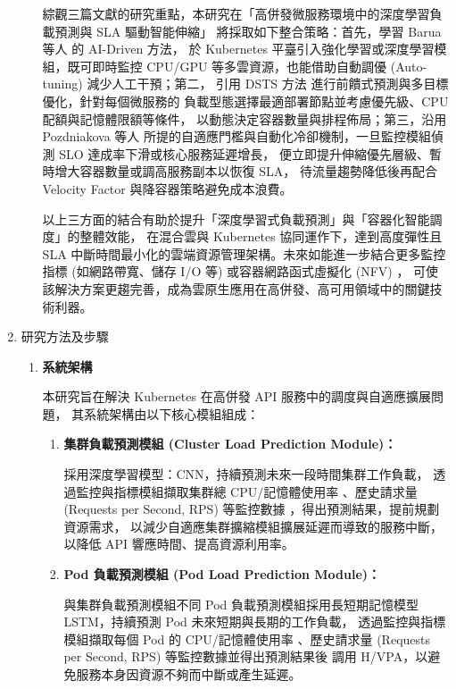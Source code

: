 \documentclass[12pt,a4paper]{article}
\begin{document}
\begin{enumerate}[label={(\zhdig*)}, leftmargin=2\parindent, listparindent=\parindent]
\begin{enumerate}[label={(\arabic*)}, leftmargin=\parindent, listparindent=\parindent]
綜觀三篇文獻的研究重點，本研究在「高併發微服務環境中的深度學習負載預測與 SLA 驅動智能伸縮」
將採取如下整合策略：首先，學習 Barua 等人\cite{22} 的 AI-Driven 方法，
於 Kubernetes 平臺引入強化學習或深度學習模組，既可即時監控 CPU/GPU
等多雲資源，也能借助自動調優 (Auto-tuning) 減少人工干預；第二，
引用 DSTS 方法\cite{24} 進行前饋式預測與多目標優化，針對每個微服務的
負載型態選擇最適部署節點並考慮優先級、CPU 配額與記憶體限額等條件，
以動態決定容器數量與排程佈局；第三，沿用 Pozdniakova 等人\cite{23}
所提的自適應門檻與自動化冷卻機制，一旦監控模組偵測 SLO 達成率下滑或核心服務延遲增長，
便立即提升伸縮優先層級、暫時增大容器數量或調高服務副本以恢復 SLA，
待流量趨勢降低後再配合 Velocity Factor 與降容器策略避免成本浪費。

以上三方面的結合有助於提升「深度學習式負載預測」與「容器化智能調度」的整體效能，
在混合雲與 Kubernetes 協同運作下，達到高度彈性且 SLA
中斷時間最小化的雲端資源管理架構。未來如能進一步結合更多監控指標
(如網路帶寬、儲存 I/O 等) 或容器網路函式虛擬化 (NFV) ，
可使該解決方案更趨完善，成為雲原生應用在高併發、高可用領域中的關鍵技術利器。

\end{enumerate}
\item 研究方法及步驟
\begin{enumerate}[label={(\arabic*)}, leftmargin=\parindent, listparindent=\parindent]

\item \textbf{
系統架構
}

本研究旨在解決 Kubernetes 在高併發 API 服務中的調度與自適應擴展問題，
其系統架構由以下核心模組組成：

\begin{enumerate}[label={(\zhdig*)}, leftmargin=\parindent, listparindent=\parindent]

    \item \textbf{集群負載預測模組 (Cluster Load Prediction Module)：}

        採用深度學習模型：CNN，持續預測未來一段時間集群工作負載，
        透過監控與指標模組擷取集群總 CPU/記憶體使用率
        、歷史請求量 (Requests per Second, RPS) 等監控數據
        ，得出預測結果，提前規劃資源需求，
        以減少自適應集群擴縮模組擴展延遲而導致的服務中斷，
        以降低 API 響應時間、提高資源利用率。

    \item \textbf{Pod 負載預測模組 (Pod Load Prediction Module)：}

        與集群負載預測模組不同 Pod 負載預測模組採用長短期記憶模型
        LSTM，持續預測 Pod 未來短期與長期的工作負載，
        透過監控與指標模組擷取每個 Pod 的 CPU/記憶體使用率
        、歷史請求量 (Requests per Second, RPS) 等監控數據並得出預測結果後
        調用 H/VPA，以避免服務本身因資源不夠而中斷或產生延遲。


\end{enumerate}
\end{enumerate}
\end{enumerate}
\end{document}
